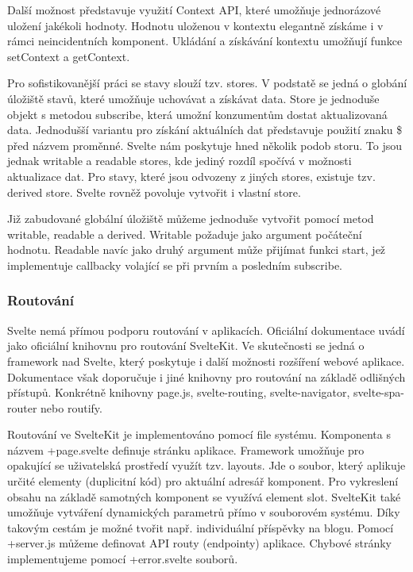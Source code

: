 Další možnost představuje využití Context API, které umožňuje jednorázové uložení jakékoli hodnoty. 
Hodnotu uloženou v kontextu elegantně získáme i v rámci neincidentních komponent. Ukládání a získávání kontextu umožňují funkce setContext a getContext.

Pro sofistikovanější práci se stavy slouží tzv. stores. V podstatě se jedná o globání úložiště stavů, které umožňuje uchovávat a získávat data. 
Store je jednoduše objekt s metodou subscribe, která umožní konzumentům dostat aktualizovaná data. 
Jednodušší variantu pro získání aktuálních dat představuje použití znaku \$ před názvem proměnné. Svelte nám poskytuje hned několik podob storu. 
To jsou jednak writable a readable stores, kde jediný rozdíl spočívá v možnosti aktualizace dat. 
Pro stavy, které jsou odvozeny z jiných stores, existuje tzv. derived store. Svelte rovněž povoluje vytvořit i vlastní store. 

Již zabudované globální úložiště můžeme jednoduše vytvořit pomocí metod writable, readable a derived. Writable požaduje jako argument počáteční hodnotu. 
Readable navíc jako druhý argument může přijímat funkci start, jež implementuje callbacky volající se při prvním a posledním subscribe.\cite{sveltehandbook,svelte,sveltestatemanagement}

\subsubsection{Routování}

Svelte nemá přímou podporu routování v aplikacích. Oficiální dokumentace uvádí jako oficiální knihovnu pro routování SvelteKit. 
Ve skutečnosti se jedná o framework nad Svelte, který poskytuje i další možnosti rozšíření webové aplikace. 
Dokumentace však doporučuje i jiné knihovny pro routování na základě odlišných přístupů. 
Konkrétně knihovny page.js, svelte-routing, svelte-navigator, svelte-spa-router nebo routify.\cite{svelte,svelteforbeginners}

Routování ve SvelteKit je implementováno pomocí file systému. Komponenta s názvem +page.svelte definuje stránku aplikace. 
Framework umožňuje pro opakující se uživatelská prostředí využít tzv. layouts. Jde o soubor, který aplikuje určité elementy (duplicitní kód) pro aktuální adresář komponent. 
Pro vykreslení obsahu na základě samotných komponent se využívá element slot. SvelteKit také umožňuje vytváření dynamických parametrů přímo v souborovém systému. 
Díky takovým cestám je možné tvořit např. individuální příspěvky na blogu. Pomocí +server.js můžeme definovat API routy (endpointy) aplikace. 
Chybové stránky implementujeme pomocí +error.svelte souborů.\cite{svelte,sveltekit}

